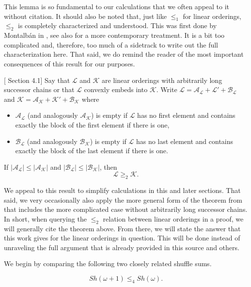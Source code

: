 \documentclass[11pt]{amsart}
\theoremstyle{definition}
\def\A{\mathcal A}
\def\B{\mathcal{B}}
\def\K{\mathcal K}
\def\L{\mathcal L}
\begin{document}
This lemma is so fundamental to our calculations that we often appeal to it without citation.
It should also be noted that, just like $\leq_1$ for linear orderings, $\leq_2$ is completely characterized and understood. 
This was first done by Montalb\'an in \cite{McountingBF}, see also \cite{GR23} for a more contemporary treatment.
It is a bit too complicated and, therefore, too much of a sidetrack to write out the full characterization here.
That said, we do remind the reader of the most important consequences of this result for our purposes.
\begin{theorem}\label{thm:2bnf}[\cite{McountingBF} Section 4.1]
    Say that $\L$ and $\K$ are linear orderings with arbitrarily long successor chains or that $\L$ convexly embeds into $\K$. Write $\L=\A_\L+\L'+\B_\L$ and $\K=\A_\K+\K'+\B_\K$ where
    \begin{itemize}
        \item $\A_\L$ (and analogously $\A_\K$) is empty if $\L$ has no first element and contains exactly the block of the first element if there is one,
        \item $\B_\L$ (and analogously $\B_\K$) is empty if $\L$ has no last element and contains exactly the block of the last element if there is one.
    \end{itemize}
    If $|\A_\L|\leq |\A_\K|$ and $|\B_\L|\leq |\B_\K|$, then
    \[\L\geq_2\K.\]
\end{theorem}
We appeal to this result to simplify calculations in this and later sections.
That said, we very occasionally also apply the more general form of the theorem from \cite{McountingBF} that includes the more complicated case without arbitrarily long successor chains.
In short, when querying the $\leq_2$ relation between linear orderings in a proof, we will generally cite the theorem above.
From there, we will state the answer that this work gives for the linear orderings in question.
This will be done instead of unraveling the full argument that is already provided in this source and others.

We begin by comparing the following two closely related shuffle sums.

\begin{lemma}\label{lem:4above}
\[
Sh(\omega+1)\leq_4 Sh(\omega).
\]
\end{lemma}
\end{document}
